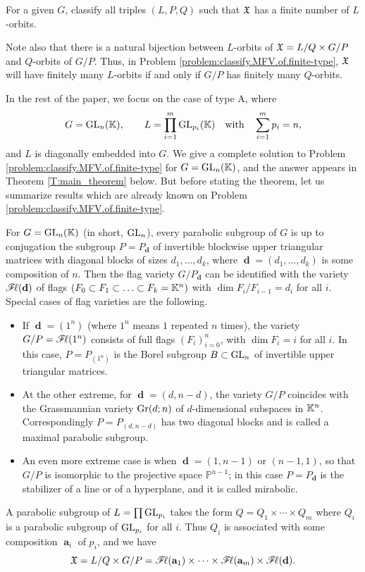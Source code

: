 \documentclass[12pt,reqno]{amsart}
\begin{document}
\begin{problem}\label{problem:classify.MFV.of.finite-type}
For a given $G$,
classify all triples $(L,P,Q)$ such that $\mathfrak{X}$ has a finite number of $L$-orbits.
\end{problem}

Note also that there is a natural bijection between $L$-orbits of $\mathfrak{X}=L/Q\times G/P$ and $Q$-orbits of $G/P$.
Thus, in Problem \ref{problem:classify.MFV.of.finite-type}, $\mathfrak{X}$ will have finitely many $L$-orbits if and only if $G/P$ has finitely many $Q$-orbits.

In the rest of the paper, we focus on the case of type A, where
%
\begin{equation}
G = \mathrm{GL}_n(\mathbb{K}) , \qquad
L = \prod_{i=1}^m \mathrm{GL}_{p_i}(\mathbb{K}) \quad \text{with} \quad \sum_{i=1}^m p_i = n ,
\end{equation}
%
and $ L $ is diagonally embedded into $ G $.
We give a complete solution to Problem \ref{problem:classify.MFV.of.finite-type} for $G=\mathrm{GL}_n(\mathbb{K})$,
and the answer appears in Theorem \ref{T:main_theorem} below.
But before stating the theorem, let us summarize results which are already known on Problem \ref{problem:classify.MFV.of.finite-type}.

For $G=\mathrm{GL}_n(\mathbb{K})$ (in short, $\mathrm{GL}_n$), every parabolic subgroup of $G$ is up to conjugation the subgroup $P=P_{\mbfd}$ of invertible blockwise upper triangular matrices with diagonal blocks of sizes $d_1,\ldots,d_k$, where $\mbfd=(d_1,\ldots,d_k)$ is some composition of $n$.
Then the flag variety $G/P_{\mbfd}$ can be identified with the variety $\mathscr{F}\!\ell(\mathbf{d})$ of flags $(F_0\subset F_1\subset \ldots\subset F_k=\mathbb{K}^n)$ with $\dim F_i/F_{i-1}=d_i$ for all $i$. Special cases of flag varieties are the following.
\begin{itemize}
    \item If $\mbfd=(1^n)$ (where $1^n$ means $1$ repeated $n$ times), the variety $G/P=\mathscr{F}\!\ell(1^n)$ consists of full flags
    $(F_i)_{i=0}^n$, with $\dim F_i=i$ for all $i$. In this case, $P=P_{(1^n)}$ is the Borel subgroup $B\subset \mathrm{GL}_n$ of invertible upper triangular matrices.
    \item At the other extreme, for $\mbfd=(d,n-d)$, the variety $G/P$ coincides with the Grassmannian variety $\mathrm{Gr}(d;n)$ of $d$-dimensional subspaces in $\mathbb{K}^n$.
    Correspondingly $P=P_{(d,n-d)}$ has two diagonal blocks and is called a maximal parabolic subgroup.
    \item An even more extreme case is when $\mbfd=(1,n-1)$ or $(n-1,1)$, so that $G/P$ is isomorphic to the projective space $\mathbb{P}^{n-1}$;
    in this case $P=P_{\mbfd}$ is the stabilizer of a line or of a hyperplane, and it is called mirabolic.
\end{itemize}
A parabolic subgroup of $L=\prod \mathrm{GL}_{p_i}$ takes the form
$Q=Q_1\times\cdots\times Q_m$ where $Q_i$ is a parabolic subgroup of $\mathrm{GL}_{p_i}$ for all $i$. Thus $Q_i$ is associated with some composition $\mbfa_i$ of $p_i$, and we have
$$
\mathfrak{X}=L/Q\times G/P=\mathscr{F}\!\ell(\mathbf{a}_1)\times\cdots\times\mathscr{F}\!\ell(\mathbf{a}_m)\times\mathscr{F}\!\ell(\mathbf{d}).
$$
\end{document}
